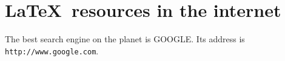 \documentclass{article}
\begin{document}
\section{\textsf{\LaTeX\ resources in the internet}}
The best search engine on the planet is GOOGLE.
Its address is \texttt{http://www.google.com}.
\end{document}
